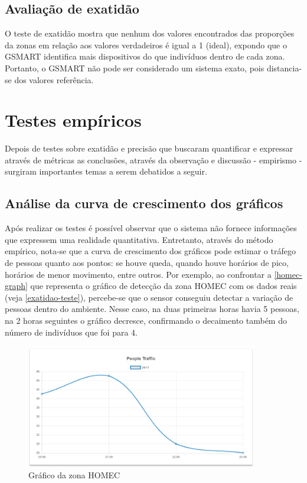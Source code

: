 \subsection{Avaliação de exatidão}
O teste de exatidão mostra que nenhum dos valores encontrados das proporções da zonas em relação aos valores
verdadeiros é igual a 1 (ideal), expondo que o GSMART identifica mais dispositivos do que indivíduos dentro
de cada zona. Portanto, o GSMART não pode ser considerado um sistema exato, pois distancia-se dos valores referência.


\section{Testes empíricos}
Depois de testes sobre exatidão e precisão que buscaram quantificar e expressar através de métricas
as conclusões, através da observação e discussão - empirismo - surgiram importantes temas a serem debatidos
a seguir.

\subsection{Análise da curva de crescimento dos gráficos}
Após realizar os testes é possível observar que o sistema não fornece informações
que expressem uma realidade quantitativa. Entretanto, através do método
empírico, nota-se que a curva de crescimento dos gráficos pode estimar o tráfego
de pessoas quanto aos pontos: se houve queda, quando houve horários de pico,
horários de menor movimento, entre outros. Por exemplo, ao confrontar a \autoref{homec-graph} que representa
o gráfico de detecção da zona HOMEC com os dados reais (veja \autoref{exatidao-teste}), percebe-se que
o sensor conseguiu detectar a variação de pessoas dentro do ambiente. Nesse caso, na duas primeiras horas havia 5 pessoas, na 2 horas
seguintes o gráfico decresce, confirmando o decaimento também do número de indivíduos que foi para 4.

\begin{figure}[!h]
  \caption{\label{homec-graph}Gráfico da zona HOMEC}
  \begin{center}
    \includegraphics[width=0.90\textwidth]{img/graph-homec.png}
  \end{center}
\end{figure}

